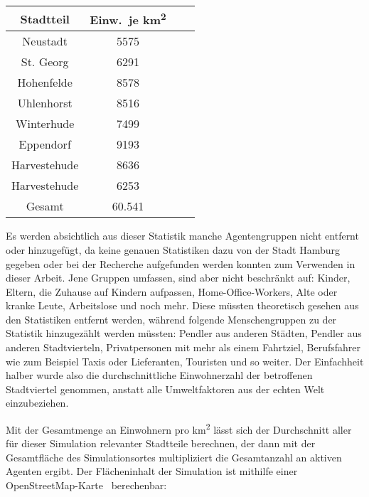 \begin{center}
    \begin{tabular}{||c c c c||}
        \hline
        Stadtteil    & Einw.\ je km\textsuperscript{2} \\ [0.5ex]
        \hline\hline
        Neustadt     & 5575                            \\
        \hline
        St. Georg    & 6291                            \\
        \hline
        Hohenfelde   & 8578                            \\
        \hline
        Uhlenhorst   & 8516                            \\
        \hline
        Winterhude   & 7499                            \\
        \hline
        Eppendorf    & 9193                            \\
        \hline
        Harvestehude & 8636                            \\
        \hline
        Harvestehude & 6253                            \\
        \hline\hline
        Gesamt       & 60.541         \\[1ex]
        \hline
    \end{tabular}
\end{center}

Es werden absichtlich aus dieser Statistik manche Agentengruppen nicht entfernt oder hinzugefügt, da keine genauen Statistiken dazu von der Stadt Hamburg gegeben oder bei der Recherche aufgefunden werden konnten zum Verwenden in dieser Arbeit.
Jene Gruppen umfassen, sind aber nicht beschränkt auf: Kinder, Eltern, die Zuhause auf Kindern aufpassen, Home-Office-Workers, Alte oder kranke Leute, Arbeitslose und noch mehr.
Diese müssten theoretisch gesehen aus den Statistiken entfernt werden, während folgende Menschengruppen zu der Statistik hinzugezählt werden müssten: Pendler aus anderen Städten, Pendler aus anderen Stadtvierteln, Privatpersonen mit mehr als einem Fahrtziel, Berufsfahrer wie zum Beispiel Taxis oder Lieferanten, Touristen und so weiter.
Der Einfachheit halber wurde also die durchschnittliche Einwohnerzahl der betroffenen Stadtviertel genommen, anstatt alle Umweltfaktoren aus der echten Welt einzubeziehen.

Mit der Gesamtmenge an Einwohnern pro km\textsuperscript{2} lässt sich der Durchschnitt aller für dieser Simulation relevanter Stadtteile berechnen, der dann mit der Gesamtfläche des Simulationsortes multipliziert die Gesamtanzahl an aktiven Agenten ergibt.
Der Flächeninhalt der Simulation ist mithilfe einer OpenStreetMap-Karte~\cite{OSF2004} berechenbar:


